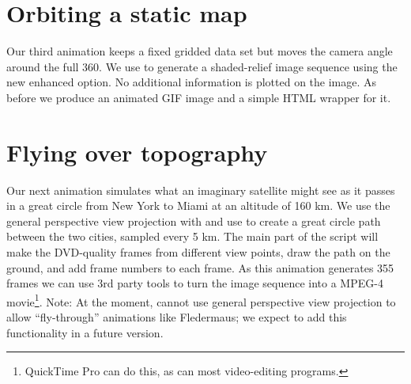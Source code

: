 

\section{Orbiting a static map}

Our third animation keeps a fixed gridded data set but moves the camera
angle around the full 360\DS.  We use  to generate a
shaded-relief image sequence using the new enhanced  option.
No additional information is plotted on the image.  As before we produce
an animated GIF image and a simple HTML wrapper for it.




\section{Flying over topography}

Our next animation simulates what an imaginary satellite might see as it passes
in a great circle from New York to Miami at an altitude of 160 km.
We use the general perspective view projection with  and
use  to create a great circle path between the two cities,
sampled every 5 km.  The main part of the script will make the DVD-quality frames from
different view points, draw the path on the ground, and add frame numbers to
each frame.  As this animation generates 355 frames we can use 3rd party tools
to turn the image sequence into a MPEG-4 movie\footnote{QuickTime Pro can do this,
as can most video-editing programs.}. Note: At the moment,  cannot
use general perspective view projection to allow ``fly-through'' animations like
Fledermaus; we expect to add this functionality in a future version.




